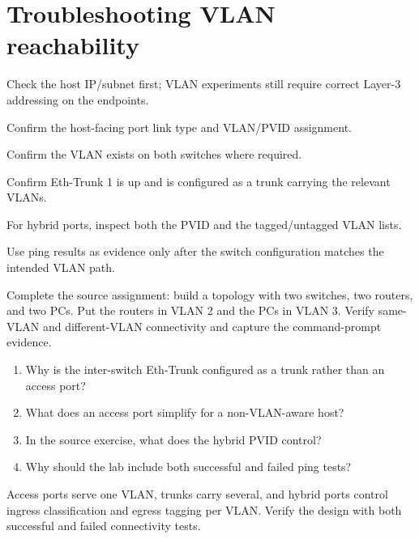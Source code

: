 \section{Troubleshooting VLAN reachability}
\begin{netsteps}
\item Check the host IP/subnet first; VLAN experiments still require correct Layer-3 addressing on the endpoints.
\item Confirm the host-facing port link type and VLAN/PVID assignment.
\item Confirm the VLAN exists on both switches where required.
\item Confirm Eth-Trunk 1 is up and is configured as a trunk carrying the relevant VLANs.
\item For hybrid ports, inspect both the PVID and the tagged/untagged VLAN lists.
\item Use ping results as evidence only after the switch configuration matches the intended VLAN path.
\end{netsteps}

\begin{tryit}
Complete the source assignment: build a topology with two switches, two routers, and two PCs. Put the routers in VLAN 2 and the PCs in VLAN 3. Verify same-VLAN and different-VLAN connectivity and capture the command-prompt evidence.
\end{tryit}

\begin{quickcheck}
\begin{enumerate}
\item Why is the inter-switch Eth-Trunk configured as a trunk rather than an access port?
\item What does an access port simplify for a non-VLAN-aware host?
\item In the source exercise, what does the hybrid PVID control?
\item Why should the lab include both successful and failed ping tests?
\end{enumerate}
\end{quickcheck}

\begin{chapterrecap}
Access ports serve one VLAN, trunks carry several, and hybrid ports control ingress classification and egress tagging per VLAN. Verify the design with both successful and failed connectivity tests.
\end{chapterrecap}


